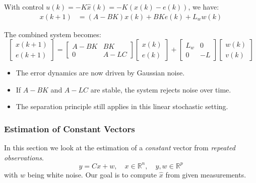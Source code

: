 With control $u(k) = -K\hat{x}(k) = -K(x(k) - e(k))$, we have:
\begin{align*}
    x(k{+}1) & = (A - BK)x(k) + BKe(k) + L_w w(k)
\end{align*}

The combined system becomes:
{\small
\begin{equation*}
    \begin{bmatrix}
        x(k{+}1) \\
        e(k{+}1)
    \end{bmatrix}
    =
    \begin{bmatrix}
        A - BK & BK      \\
        0      & A - L C
    \end{bmatrix}
    \begin{bmatrix}
        x(k) \\
        e(k)
    \end{bmatrix}
    +
    \begin{bmatrix}     %
        L_w & 0  \\
        0   & -L
    \end{bmatrix}
    \begin{bmatrix}
        w(k) \\
        v(k)
    \end{bmatrix}
\end{equation*}
}

\newpar{}
\begin{itemize}
    \item The error dynamics are now driven by Gaussian noise.
    \item If $A - BK$ and $A - L C$ are stable, the system rejects noise over time.
    \item The separation principle still applies in this linear stochastic setting.
\end{itemize}


\subsubsection{Estimation of Constant Vectors}
In this section we look at the estimation of a \textit{constant} vector from \textit{repeated observations}.
\newpar{}
\begin{equation*}
    y = Cx + w, \quad x \in \mathbb{R}^n, \quad y, w \in \mathbb{R}^p
\end{equation*}
with $w$ being white noise.
\newpar{}
Our goal is to compute $\hat{x}$ from given measurements.

